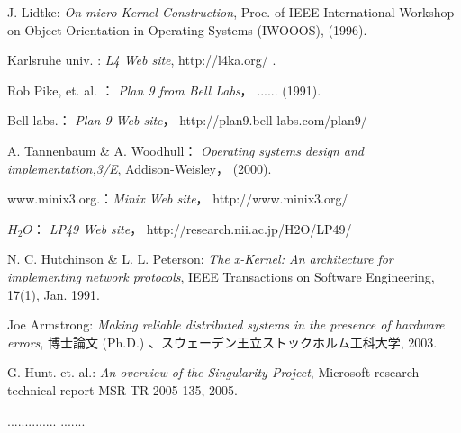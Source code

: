 \documentclass[draft]{ipsjpapers}
\begin{document}
\begin{thebibliography}{10}

J. Lidtke: {\em On micro-Kernel Construction}, 
Proc. of IEEE International Workshop on Object-Orientation in Operating Systems (IWOOOS), (1996). 

Karlsruhe univ. : {\em L4 Web site}, 
http://l4ka.org/ .


Rob Pike, et. al. ： {\em Plan 9 from Bell Labs}， ...... (1991).

Bell labs.： {\em Plan 9 Web site}， 
http://plan9.bell-labs.com/plan9/

A. Tannenbaum \& A. Woodhull： {\em Operating systems design and implementation,3/E}, 
Addison-Weisley， (2000).

www.minix3.org.：{\em Minix  Web site}， 
http://www.minix3.org/

$H_2O$： {\em LP49  Web site}， 
http://research.nii.ac.jp/H2O/LP49/

N. C. Hutchinson \& L. L. Peterson: {\em The x-Kernel: An architecture for implementing network protocols},  IEEE Transactions on Software Engineering, 17(1), Jan. 1991. 

Joe Armstrong: {\em Making reliable distributed systems in the presence of hardware errors}, 博士論文 (Ph.D.) 、スウェーデン王立ストックホルム工科大学, 2003.

G. Hunt. et. al.: {\em An overview of the Singularity Project},
Microsoft research technical report MSR-TR-2005-135, 2005.

\end{thebibliography}


\begin{biography}
..............
%
.......
\end{biography}
\end{document}
